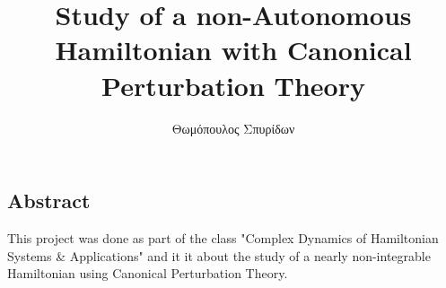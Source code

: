 \documentclass[a4paper,11pt]{book}
\title{Study of a non-Autonomous Hamiltonian with Canonical Perturbation Theory}
\author{Θωμόπουλος Σπυρίδων}
\begin{document}


\begin{changemargin}{2cm}{2cm} 
	\section*{Abstract} 
		This project was done as part of the class "Complex Dynamics of Hamiltonian Systems \& Applications" and it it about the study of a nearly non-integrable Hamiltonian 
		using Canonical Perturbation Theory. 
	\let\cleardoublepage\clearpage
\end{changemargin}




\end{document}
